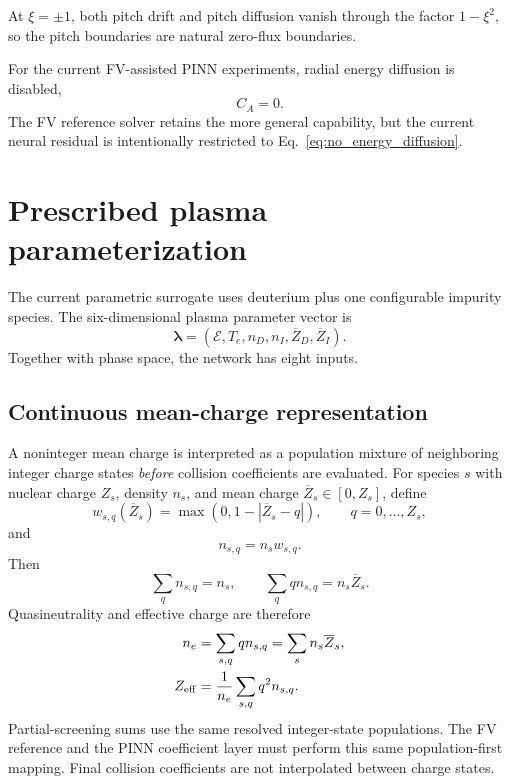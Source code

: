 \documentclass[11pt]{article}
\newcommand{\lam}{\bm\lambda}
\newcommand{\Ecfg}{\mathcal E}
\begin{document}
At $\xi=\pm1$, both pitch drift and pitch diffusion vanish through the factor $1-\xi^2$,
so the pitch boundaries are natural zero-flux boundaries.

For the current FV-assisted PINN experiments, radial energy diffusion is disabled,
\begin{equation}
 C_A=0.
 \label{eq:no_energy_diffusion}
\end{equation}
The FV reference solver retains the more general capability, but the current neural
residual is intentionally restricted to Eq.~\eqref{eq:no_energy_diffusion}.

\section{Prescribed plasma parameterization}
\label{sec:parameters}

The current parametric surrogate uses deuterium plus one configurable impurity species.
The six-dimensional plasma parameter vector is
\begin{equation}
 \boxed{
 \lam=\left(\Ecfg,T_e,n_D,n_I,\overline Z_D,\overline Z_I\right).
 }
 \label{eq:lambda}
\end{equation}
Together with phase space, the network has eight inputs.

\subsection{Continuous mean-charge representation}

A noninteger mean charge is interpreted as a population mixture of neighboring integer
charge states \emph{before} collision coefficients are evaluated.  For species $s$ with
nuclear charge $Z_s$, density $n_s$, and mean charge $\overline Z_s\in[0,Z_s]$, define
\begin{equation}
 w_{s,q}(\overline Z_s)=\max\left(0,1-|\overline Z_s-q|\right),
 \qquad q=0,\ldots,Z_s,
 \label{eq:charge_weights}
\end{equation}
and
\begin{equation}
 n_{s,q}=n_s w_{s,q}.
\end{equation}
Then
\begin{equation}
 \sum_qn_{s,q}=n_s,
 \qquad
 \sum_q q n_{s,q}=n_s\overline Z_s.
\end{equation}
Quasineutrality and effective charge are therefore
\begin{align}
 n_e&=\sum_{s,q}q n_{s,q}=\sum_s n_s\overline Z_s,
 \label{eq:ne}\\
 Z_{\rm eff}&=\frac{1}{n_e}\sum_{s,q}q^2 n_{s,q}.
 \label{eq:zeff}
\end{align}
Partial-screening sums use the same resolved integer-state populations.  The FV reference
and the PINN coefficient layer must perform this same population-first mapping.  Final
collision coefficients are not interpolated between charge states.
\end{document}
